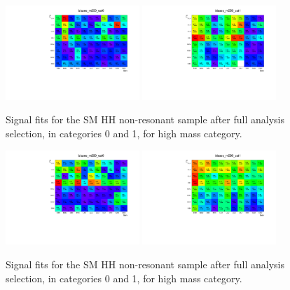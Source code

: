 \begin{figure}[thb]
  \centering
  \includegraphics[width=0.45\textwidth]{figures/sec-bias/biases_m250_cat0.pdf}\hfil
  \includegraphics[width=0.45\textwidth]{figures/sec-bias/biases_m250_cat1.pdf}\hfil
  \caption{Signal fits for the SM HH non-resonant sample after full analysis selection, in categories 0 and 1, for high mass category.}
  \label{fig:bkg_bias1}
\end{figure}
\begin{figure}[thb]
  \centering
  \includegraphics[width=0.45\textwidth]{figures/sec-bias/biases_m280_cat0.pdf}\hfil
  \includegraphics[width=0.45\textwidth]{figures/sec-bias/biases_m280_cat1.pdf}\hfil
  \caption{Signal fits for the SM HH non-resonant sample after full analysis selection, in categories 0 and 1, for high mass category.}
  \label{fig:bkg_bias2}
\end{figure}
